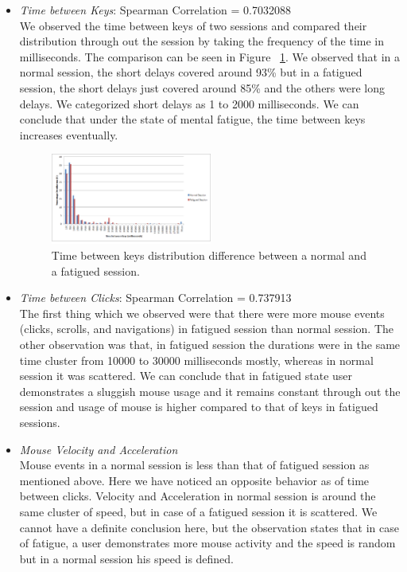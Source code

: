 \documentclass{acm_proc_article-sp}
\begin{document}
\begin{itemize}
  \item \textit{Time between Keys}: Spearman Correlation = 0.7032088\\
  We observed the time between keys of two sessions and compared their
  distribution through out the session by taking the frequency of the time in
  milliseconds. The comparison can be seen in Figure ~\ref{fig:keys}. We
  observed that in a normal session, the short delays covered around 93\% but in
  a fatigued session, the short delays just covered around 85\% and the others
  were long delays. We categorized short delays as 1 to 2000
  milliseconds. We can conclude that under the state of mental fatigue,
  the time between keys increases eventually.
  \begin{figure}
	\centering
	\includegraphics[width=0.5\textwidth,natwidth=805,natheight=455]{timebwkeys.png}
	\caption{Time between keys distribution difference between a normal and a
	fatigued session.}
	\label{fig:keys}
   \end{figure}
  \item \textit{Time between Clicks}: Spearman Correlation = 0.737913\\
  The first thing which we observed were that there were more mouse events
  (clicks, scrolls, and navigations) in fatigued session than normal session.
  The other observation was that, in fatigued session the durations were
  in the same time cluster from 10000 to 30000 milliseconds mostly,
  whereas in normal session it was scattered. We can conclude that in fatigued
  state user demonstrates a sluggish mouse usage and it remains constant
  through out the session and usage of mouse is higher compared to that of
  keys in fatigued sessions.
  \item \textit{Mouse Velocity and Acceleration}\\
  Mouse events in a normal session is less than that of fatigued session
  as mentioned above. Here we have noticed an opposite behavior as of time
  between clicks. Velocity and Acceleration in normal session is around the same
  cluster of speed, but in case of a fatigued session it is scattered. We cannot
  have a definite conclusion here, but the observation states that in case of
  fatigue, a user demonstrates more mouse activity and the speed is random but
  in a normal session his speed is defined.
\end{itemize}
\end{document}
